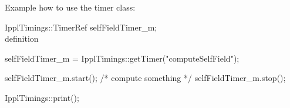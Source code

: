 \clearpage

Example how to use the timer class: \\
\begin{code}

IpplTimings::TimerRef selfFieldTimer_m;    \\ definition

selfFieldTimer_m = IpplTimings::getTimer("computeSelfField");

selfFieldTimer_m.start();
    /* compute something */
selfFieldTimer_m.stop();

IpplTimings::print();

\end{code}


